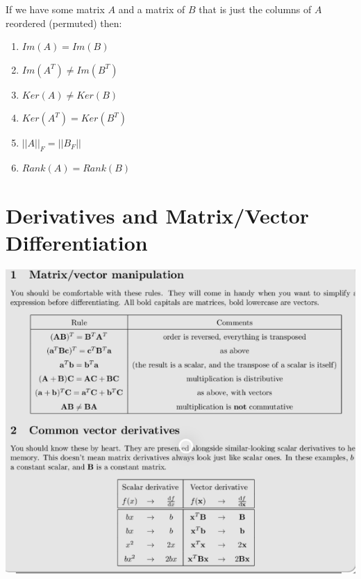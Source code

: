 \documentclass[12pt,twoside]{article}
\begin{document}
If we have some matrix $A$ and a matrix of $B$ that is just the columns of $A$ reordered (permuted) then: 
\begin{enumerate}
    \item $Im(A) = Im(B)$
    \item $Im(A^T) \neq Im(B^T)$
    \item $Ker(A) \neq Ker(B)$
    \item $Ker(A^T) = Ker(B^T)$
    \item $||A||_F = ||B_F||$
    \item $Rank(A) = Rank(B)$
\end{enumerate}

\section*{Derivatives and Matrix/Vector Differentiation}

\includegraphics[scale=1]{vector calc.png}
\end{document}
